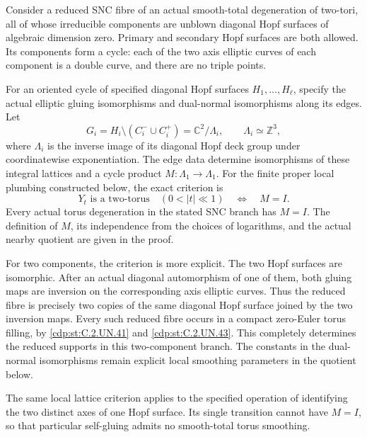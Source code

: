 
\begin{proposition}\label{cdp:st:C.2.UN.46}
Consider a reduced SNC fibre of an actual smooth-total
degeneration of two-tori, all of whose irreducible components
are unblown diagonal Hopf surfaces of algebraic dimension zero.
Primary and secondary Hopf surfaces are both allowed.
Its components form a cycle: each of the two axis elliptic
curves of each component is a double curve, and there are
no triple points.

For an oriented cycle of specified diagonal Hopf surfaces
$H_1,\ldots,H_\ell$, specify the actual elliptic gluing
isomorphisms and dual-normal isomorphisms along its edges.
Let
\[
 G_i=H_i\setminus(C_i^-\cup C_i^+)
       =\mathbb C^2/\Lambda_i,\qquad \Lambda_i\simeq\mathbb Z^3,
\tag{C.HC.1}\label{cdp:eq:C.HC.1}
\]
where $\Lambda_i$ is the inverse image of its diagonal
Hopf deck group under coordinatewise exponentiation.
The edge data determine isomorphisms of these integral
lattices and a cycle product $M:\Lambda_1\to\Lambda_1$.
For the finite proper local plumbing constructed below,
the exact criterion is
\[
 \text{$Y_t$ is a two-torus}\quad(0<|t|\ll1)
       \quad\Longleftrightarrow\quad M=I.
\tag{C.HC.2}\label{cdp:eq:C.HC.2}
\]
Every actual torus degeneration in the stated SNC branch
has $M=I$. The definition of $M$, its independence from
the choices of logarithms, and the actual nearby quotient
are given in the proof.

For two components, the criterion is more explicit.
The two Hopf surfaces are isomorphic. After an actual
diagonal automorphism of one of them, both gluing maps
are inversion on the corresponding axis elliptic curves.
Thus the reduced fibre is precisely two copies of the
same diagonal Hopf surface joined by the two inversion
maps. Every such reduced fibre occurs in a compact
zero-Euler torus filling, by \ref{cdp:st:C.2.UN.41} and \ref{cdp:st:C.2.UN.43}.
This completely determines the reduced supports in
this two-component branch. The constants in the
dual-normal isomorphisms remain explicit local
smoothing parameters in the quotient below.

The same local lattice criterion applies to the
specified operation of identifying the two distinct
axes of one Hopf surface. Its single transition
cannot have $M=I$, so that particular self-gluing
admits no smooth-total torus smoothing.
\end{proposition}

